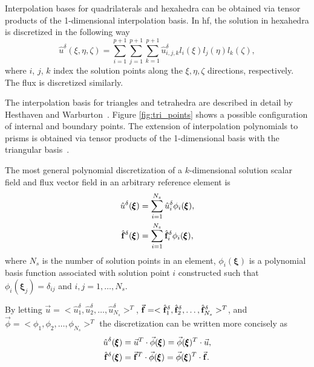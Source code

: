 Interpolation bases for quadrilaterals and hexahedra can be obtained via tensor products of the 1-dimensional interpolation basis. In \gls{hf}, the solution in hexahedra is discretized in the following way
\begin{equation}
{\hat{u}}^\delta(\xi,\eta,\zeta) = \sum_{i=1}^{p+1} \sum_{j=1}^{p+1} \sum_{k=1}^{p+1}
{\hat{u}}^\delta_{i,j,k} l_i(\xi) l_j(\eta) l_k(\zeta),
\end{equation}
where $i$, $j$, $k$ index the solution points along the $\xi, \eta, \zeta$ directions, respectively. The flux is discretized similarly.

The interpolation basis for triangles and tetrahedra are described in detail by Hesthaven and Warburton~\cite{hesthaven2007nodal}. Figure \ref{fig:tri_points} shows a possible configuration of internal and boundary points. The extension of interpolation polynomials to prisms is obtained via tensor products of the 1-dimensional basis with the triangular basis~\cite{castonguay2011}. 

The most general polynomial discretization of a $k$-dimensional solution scalar field and flux vector field in an arbitrary reference element is
\begin{align}
\label{eqn:general_u}
\hat{u}^\delta({\pmb \xi}) &= \sum_{i=1}^{N_s} \hat{u}_i^\delta {\phi}_i({\pmb \xi}),\\
\hat{\bf f}^\delta({\pmb \xi}) &= \sum_{i=1}^{N_s} \hat{\bf f}_i^\delta {\phi}_i({\pmb \xi}),
\end{align}
where $N_s$ is the number of solution points in an element, ${\phi}_i({\pmb \xi})$ is a polynomial basis function associated with solution point $i$ constructed such that ${\phi}_i({\pmb \xi}_j) = \delta_{ij}$ and $i,j = 1,\dots,N_s$.

By letting $\vec{u} = <\hat{u}_1^\delta, \hat{u}_2^\delta,\dots,\hat{u}_{N_s}^\delta>^T $, $\vec{\bf f} = <\hat{\bf f}_1^\delta, \hat{\bf f}_2^\delta,\dots,\hat{\bf f}_{N_s}^\delta>^T $, and $\vec{\phi} = <\phi_1,\phi_2,\dots,\phi_{N_s}>^T$ the discretization can be written more concisely as
\begin{equation}
\begin{split}
\hat{u}^\delta({\pmb \xi}) &= \vec{u}^T \cdot \vec{\phi}({\pmb \xi}) =  \vec{\phi}({\pmb \xi})^T\cdot \vec{u},\\
\hat{\bf f}^\delta({\pmb \xi}) &= \vec{\bf f}^T \cdot \vec{\phi}({\pmb \xi}) = \vec{\phi}({\pmb \xi})^T \cdot \vec{\bf f}.
\end{split}
\end{equation}

